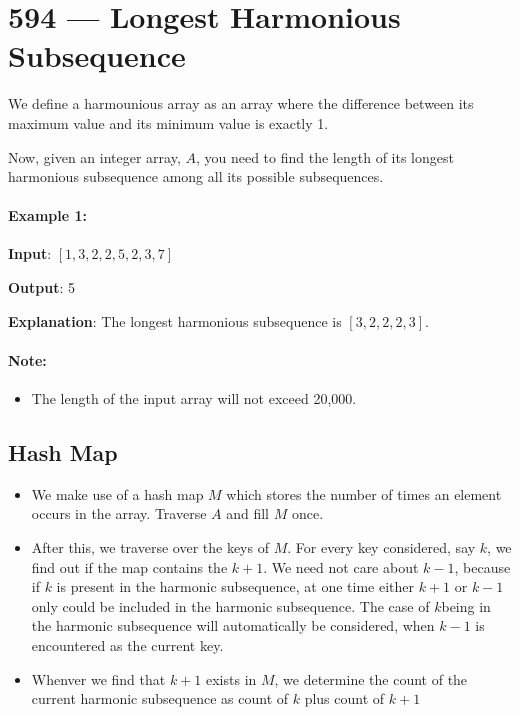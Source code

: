 \section{594 --- Longest Harmonious Subsequence}
We define a harmounious array as an array where the difference between its maximum value and its minimum value is exactly 1.

Now, given an integer array, $A$, you need to find the length of its longest harmonious subsequence among all its possible subsequences.

\paragraph{Example 1:}
\begin{flushleft}

\textbf{Input}: $[1,3,2,2,5,2,3,7]$

\textbf{Output}: 5

\textbf{Explanation}: The longest harmonious subsequence is $[3,2,2,2,3]$.
 

\end{flushleft}

\paragraph{Note:} 

\begin{itemize}
\item The length of the input array will not exceed 20,000.
\end{itemize}

\subsection{Hash Map}
\begin{itemize}
\item We make use of a hash map $M$ which stores the number of times an element occurs in the array. Traverse $A$ and fill $M$ once.
\item After this, we traverse over the keys of $M$. For every key considered, say $k$, we find out if the map contains the $k + 1$. We need not care about $k-1$, because if $k$ is present in the harmonic subsequence, at one time either $k+1$ or $k - 1$ only could be included in the harmonic subsequence. The case of $k$being in the harmonic subsequence will automatically be considered, when $k- 1$ is encountered as the current key.
\item Whenver we find that $k+ 1$ exists in $M$, we determine the count of the current harmonic subsequence as count of $k$ plus count of $k+1$
\end{itemize}

